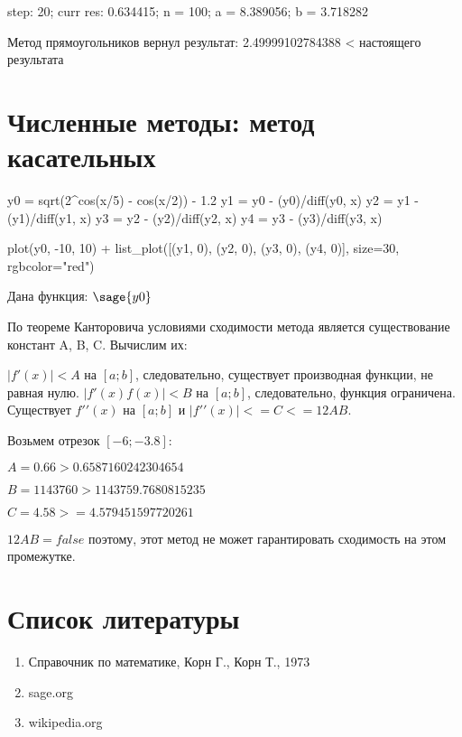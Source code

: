 \documentclass[14pt]{extreport}
\begin{document}
step: 20; curr res: 0.634415; n = 100; a = 8.389056; b = 3.718282

Метод прямоугольников вернул результат: 2.49999102784388 < настоящего результата

\section{Численные методы: метод касательных}
\begin{sagesilent}
y0 = sqrt(2^cos(x/5) - cos(x/2)) - 1.2
y1 = y0 - (y0)/diff(y0, x)
y2 = y1 - (y1)/diff(y1, x)
y3 = y2 - (y2)/diff(y2, x)
y4 = y3 - (y3)/diff(y3, x)

plot(y0, -10, 10) + list_plot([(y1, 0), (y2, 0), (y3, 0), (y4, 0)], size=30, rgbcolor="red")

\end{sagesilent}

Дана функция: $\sage{y0}$

По теореме Канторовича условиями сходимости метода является существование констант A, B, C. Вычислим их:

$|f′(x)| < A$ на $[a; b]$, следовательно, существует производная функции, не равная нулю. $|f′(x)f(x)| < B$ на $[a; b]$, следовательно,
функция ограничена. Существует $f′′(x)$ на $[a; b]$ и
$|f′′(x)| <= C <= 12AB$.

Возьмем отрезок $[−6; −3.8]$:

$A =0.66 > 0.6587160242304654$

$B =1143760>1143759.7680815235$

$C =4.58 >= 4.579451597720261$

$12AB = false$ поэтому, этот метод не может гарантировать сходимость на этом промежутке.

\newpage
\section{Список литературы}
\begin{enumerate}
\item{Справочник по математике, Корн Г., Корн Т., 1973}
\item{sage.org}
\item{wikipedia.org}
\end{enumerate}
\end{document}
